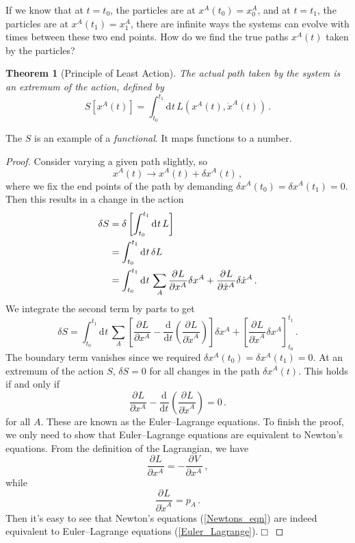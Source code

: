 \documentclass{article}
\theoremstyle{plain}\theoremheaderfont{\normalfont\itshape}\theorembodyfont{\rmfamily}\theoremseparator{.}\newtheorem*{rem}{Remark}\newtheorem*{ex}{Example}\newtheorem*{proof}{Proof}\newtheorem*{altp}{Alternative proof}
\theoremstyle{plain}\theoremheaderfont{\normalfont\bfseries}\theorembodyfont{\rmfamily}\theoremseparator{.}\newtheorem{thm}{Theorem}[section]\newtheorem{lem}[thm]{Lemma}\newtheorem{prop}[thm]{Proposition}\newtheorem*{cor}{Corollary}\newtheorem{defn}[thm]{Definition}\newtheorem{clm}[thm]{Claim}\newtheorem{clminproof}{Claim}\newtheorem{alg}[thm]{Algorithm}\newtheorem{hyp}[thm]{Hypothesis}\newtheorem{law}[thm]{Law}
\theoremstyle{break}\theoremheaderfont{\normalfont\itshape}\theorembodyfont{\rmfamily}\theoremseparator{.\medskip}\newtheorem*{proofskip}{Proof}\newtheorem*{exs}{Examples}\newtheorem*{rems}{Remarks}
\theoremstyle{break}\theoremheaderfont{\normalfont\bfseries}\theorembodyfont{\rmfamily}\theoremseparator{.\medskip}\newtheorem{lemskip}[thm]{Lemma}\newtheorem{defnskip}[thm]{Definition}\newtheorem{propskip}[thm]{Proposition}\newtheorem{thmskip}[thm]{Theorem}
\numberwithin{equation}{section}
\newcommand{\qed}{\hfill\ensuremath{\Box}}
\newcommand{\dd}[2][]{\mathrm{d}^{#1} #2\,}
\newcommand{\dv}[3][]{\frac{\mathrm{d}^{#1} #2}{{\mathrm{d} #3}^{#1}}}
\newcommand{\pdv}[3][]{\frac{\partial^{#1} #2}{{\partial #3}^{#1}}}
\begin{document}
    If we know that at \(t=t_0\), the particles are at \(x^A(t_0)=x^A_0\), and at \(t=t_1\), the particles are at \(x^A(t_1)=x^A_1\), there are infinite ways the systems can evolve with times between these two end points. How do we find the true paths \(x^A(t)\) taken by the particles?
    \begin{thm}[Principle of Least Action]
        The actual path taken by the system is an extremum of the \textit{action}, defined by
        \begin{equation}
            S[x^A(t)]=\int_{t_0}^{t_1}\dd{t}L(x^A(t),\dot{x}^A(t))\,.
        \end{equation}
    \end{thm}
    The \(S\) is an example of a \textit{functional}. It maps functions to a number.
    \begin{proof}
        Consider varying a given path slightly, so
        \begin{equation}
            x^A(t)\longrightarrow x^A(t)+\delta x^A(t)\,,
        \end{equation}
        where we fix the end points of the path by demanding \(\delta x^A(t_0)=\delta x^A(t_1)=0\). Then this results in a change in the action
        \begin{align}
            \delta S&=\delta\left[\int_{t_0}^{t_1}\dd{t}L\right]\notag\\
            &=\int_{t_0}^{t_1}\dd{t}\delta L\notag\\
            &=\int_{t_0}^{t_1}\dd{t}\sum_{A}\pdv{L}{x^A}\delta x^A+\pdv{L}{\dot{x}^A}\delta\dot{x}^A\,.
        \end{align}
        We integrate the second term by parts to get
        \begin{equation}
            \delta S=\int_{t_0}^{t_1}\dd{t}\sum_A\left[\pdv{L}{x^A}-\dv{}{t}\left(\pdv{L}{\dot{x}^A}\right)\right]\delta x^A + \left[\pdv{L}{\dot{x}^A}\delta x^A\right]_{t_0}^{t_1}\,.
        \end{equation}
        The boundary term vanishes since we required \(\delta x^A(t_0)=\delta x^A(t_1)=0\). At an extremum of the action \(S\), \(\delta S=0\) for all changes in the path \(\delta x^A(t)\). This holds if and only if
        \begin{equation}\label{Euler_Lagrange}
            \pdv{L}{x^A}-\dv{}{t}\left(\pdv{L}{\dot{x}^A}\right)=0\,.
        \end{equation}
        for all \(A\). These are known as the Euler--Lagrange equations. To finish the proof, we only need to show that Euler--Lagrange equations are equivalent to Newton's equations. From the definition of the Lagrangian, we have
        \begin{equation}
            \pdv{L}{x^A}=-\pdv{V}{x^A}\,,
        \end{equation}
        while
        \begin{equation}
            \pdv{L}{\dot{x}^A}=p_A\,.
        \end{equation}
        Then it's easy to see that Newton's equations (\ref{Newtons_eqn}) are indeed equivalent to Euler--Lagrange equations (\ref{Euler_Lagrange}).\qed
    \end{proof}
\end{document}
